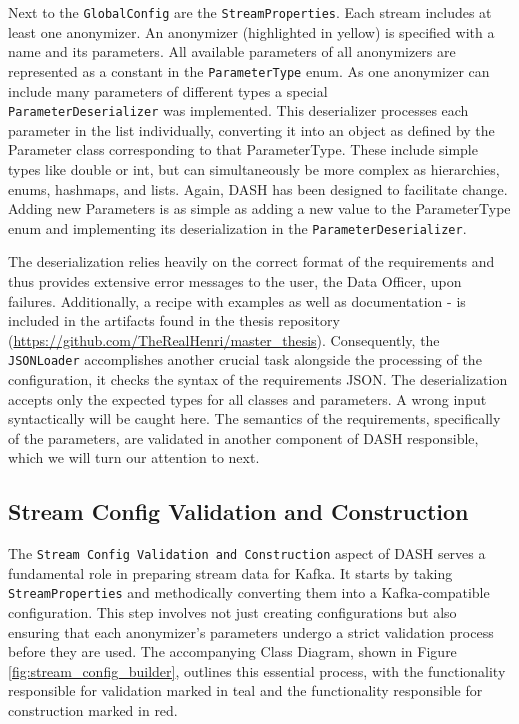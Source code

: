 Next to the \texttt{GlobalConfig} are the \texttt{StreamProperties}. Each stream includes at least one anonymizer. An anonymizer (highlighted in yellow) is specified with a name and its parameters. All available parameters of all anonymizers are represented as a constant in the \texttt{ParameterType} enum. As one anonymizer can include many parameters of different types a special \\ \texttt{ParameterDeserializer} was implemented. This deserializer processes each parameter in the list individually, converting it into an object as defined by the Parameter class corresponding to that ParameterType. These include simple types like double or int, but can simultaneously be more complex as hierarchies, enums, hashmaps, and lists. Again, \ac{DASH} has been designed to facilitate change. Adding new Parameters is as simple as adding a new value to the ParameterType enum and implementing its deserialization in the \texttt{ParameterDeserializer}.\par
The deserialization relies heavily on the correct format of the requirements and thus provides extensive error messages to the user, the Data Officer, upon failures. Additionally, a recipe with examples as well as documentation - is included in the artifacts found in the thesis repository (\url{https://github.com/TheRealHenri/master_thesis}). Consequently, the \texttt{JSONLoader} accomplishes another crucial task alongside the processing of the configuration, it checks the syntax of the requirements JSON. The deserialization accepts only the expected types for all classes and parameters. A wrong input syntactically will be caught here. The semantics of the requirements, specifically of the parameters, are validated in another component of \ac{DASH} responsible, which we will turn our attention to next. 

\subsection{Stream Config Validation and Construction}
The \texttt{Stream Config Validation and Construction} aspect of DASH serves a fundamental role in preparing stream data for Kafka. It starts by taking \\ \texttt{StreamProperties} and methodically converting them into a Kafka-compatible configuration. This step involves not just creating configurations but also ensuring that each anonymizer's parameters undergo a strict validation process before they are used. The accompanying Class Diagram, shown in Figure \ref{fig:stream_config_builder}, outlines this essential process, with the functionality responsible for validation marked in teal and the functionality responsible for construction marked in red. \par

